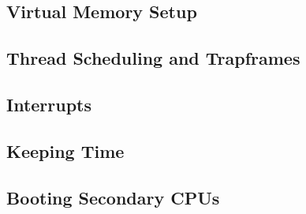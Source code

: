 \subsection{Virtual Memory Setup}
\subsection{Thread Scheduling and Trapframes}
\subsection{Interrupts}
\subsection{Keeping Time}
\subsection{Booting Secondary CPUs}

